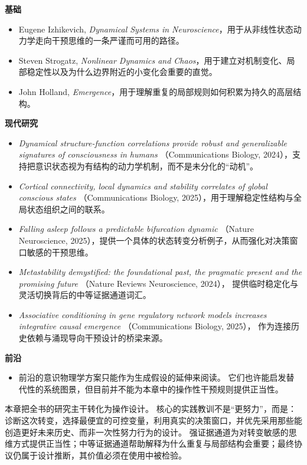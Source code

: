 \begin{readingbox}
\textbf{基础}
\begin{itemize}[nosep]
  \item Eugene Izhikevich, \emph{Dynamical Systems in Neuroscience}，用于从非线性状态动力学走向干预思维的一条严谨而可用的路径。
  \item Steven Strogatz, \emph{Nonlinear Dynamics and Chaos}，用于建立对机制变化、局部稳定性以及为什么边界附近的小变化会重要的直觉。
  \item John Holland, \emph{Emergence}，用于理解重复的局部规则如何积累为持久的高层结构。
\end{itemize}
\textbf{现代研究}
\begin{itemize}[nosep]
  \item \emph{Dynamical structure-function correlations provide robust and
        generalizable signatures of consciousness in humans} （Communications
        Biology, 2024），支持把意识状态视为有结构的动力学机制，而不是未分化的“动机”。
  \item \emph{Cortical connectivity, local dynamics and stability correlates of
        global conscious states} （Communications Biology, 2025），用于理解稳定性结构与全局状态组织之间的联系。
  \item \emph{Falling asleep follows a predictable bifurcation dynamic}
        （Nature Neuroscience, 2025），提供一个具体的状态转变分析例子，从而强化对决策窗口敏感的干预思维。
  \item \emph{Metastability demystified: the foundational past, the pragmatic
        present and the promising future} （Nature Reviews Neuroscience, 2024），
        提供临时稳定化与灵活切换背后的中等证据通道词汇。
  \item \emph{Associative conditioning in gene regulatory network models
        increases integrative causal emergence} （Communications Biology, 2025），
        作为连接历史依赖与涌现导向干预设计的桥梁来源。
\end{itemize}
\textbf{前沿}
\begin{itemize}[nosep]
  \item 前沿的意识物理学方案只能作为生成假设的延伸来阅读。
        它们也许能启发替代性的系统图景，但目前并不能为本章中的操作性干预规则提供正当性。
\end{itemize}
\end{readingbox}

\begin{summarybox}
本章把全书的研究主干转化为操作设计。
核心的实践教训不是“更努力”，而是：诊断这次转变，选择最便宜的可控变量，利用真实的决策窗口，并优先采用那些能创造更好未来历史、而非一次性努力行为的设计。
强证据通道为对转变敏感的思维方式提供正当性；中等证据通道帮助解释为什么重复与局部结构会重要；最终协议仍属于设计推断，其价值必须在使用中被检验。
\end{summarybox}